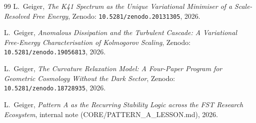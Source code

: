 \documentclass[11pt,a4paper]{article}
\theoremstyle{remark}
\begin{document}
\begin{thebibliography}{99}
L.~Geiger,
\emph{The K41 Spectrum as the Unique Variational Minimiser of a
Scale-Resolved Free Energy},
Zenodo: \texttt{10.5281/zenodo.20131305}, 2026.

L.~Geiger,
\emph{Anomalous Dissipation and the Turbulent Cascade: A Variational
Free-Energy Characterisation of Kolmogorov Scaling},
Zenodo: \texttt{10.5281/zenodo.19056813}, 2026.

L.~Geiger,
\emph{The Curvature Relaxation Model: A Four-Paper Program for
Geometric Cosmology Without the Dark Sector},
Zenodo: \texttt{10.5281/zenodo.18728935}, 2026.

L.~Geiger,
\emph{Pattern A as the Recurring Stability Logic across the FST
Research Ecosystem}, internal note (CORE/PATTERN\_A\_LESSON.md),
2026.

\end{thebibliography}
\end{document}
